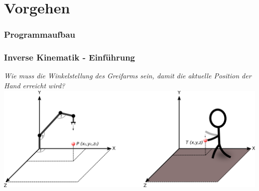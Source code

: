 \section{Vorgehen}

\begin{frame}
  \frametitle{Programmaufbau}
\end{frame}
 
 
 
 
 

\begin{frame}
\frametitle{Inverse Kinematik - Einführung}
\textit{Wie muss die Winkelstellung des Greifarms sein, damit die aktuelle Position der Hand erreicht wird?}\\
\vspace*{1cm}
\includegraphics[width=\textwidth]{imgs/kinematikProblem.png}
\end{frame}

